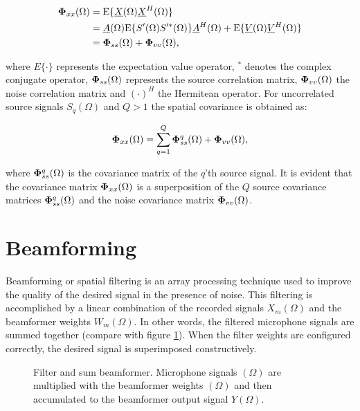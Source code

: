 
\begin{equation}
\begin{split}
\mathbf{\Phi}_{xx}(\Omega) &= \text{E}\{\underline{X}(\Omega)\underline{X}^H(\Omega)\} \\
 &= \underline{A}(\Omega) \text{E} \{ S'(\Omega)  S'^*(\Omega)\}\underline{A}^H(\Omega) + \text{E}\{\underline{V}(\Omega)\underline{V}^H(\Omega)\}\\
 &= \mathbf{\Phi}_{ss}(\Omega) + \mathbf{\Phi}_{vv}(\Omega),
\end{split}
\end{equation}

where $E\{\cdot\}$ represents the expectation value operator, $^*$ denotes the complex conjugate operator, $\mathbf{\Phi}_{ss}(\Omega)$ represents the source correlation matrix, $\mathbf{\Phi}_{vv}(\Omega)$ the noise correlation matrix and $(\cdot)^H$ the Hermitean operator. For uncorrelated source signals $S_q(\Omega)$ and $Q>1$ the spatial covariance is obtained as:

\begin{equation}
 \mathbf{\Phi}_{xx}(\Omega) = \sum_{q=1}^Q \mathbf{\Phi}^q_{ss}(\Omega) + \mathbf{\Phi}_{vv}(\Omega),
\end{equation}

where $\mathbf{\Phi}^q_{ss}(\Omega)$ is the covariance matrix of the $q$'th source signal. It is evident that the covariance matrix $\mathbf{\Phi}_{xx}(\Omega)$ is a superposition of the $Q$ source covariance matrices $\mathbf{\Phi}^q_{ss}(\Omega)$ and the noise covariance matrix $\mathbf{\Phi}_{vv}(\Omega)$.

\section{Beamforming}
\label{sec:beamforming}
Beamforming or spatial filtering is an array processing technique used to improve the quality of the desired signal in the presence of noise. This filtering is accomplished by a linear combination of the recorded signals $X_m(\Omega)$ and the beamformer weights $W_m(\Omega)$. In other words, the filtered microphone signals are summed together (compare with figure \ref{fig:filtersum}). When the filter weights are configured correctly, the desired signal is superimposed constructively.
\begin{figure}[ht]
	\centering
	
	\caption{Filter and sum beamformer.	Microphone signals $(\Omega)$ are multiplied with the beamformer weights $(\Omega)$ and then accumulated to the beamformer output signal $Y(\Omega)$.}
	\label{fig:filtersum}
\end{figure}

